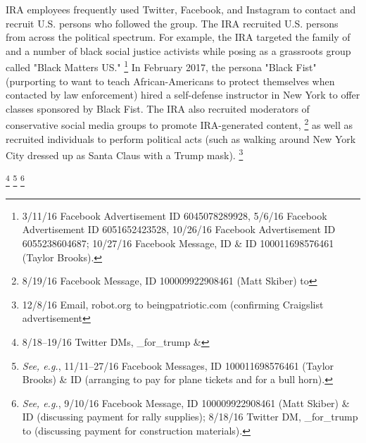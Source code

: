 IRA employees frequently used  Twitter, Facebook, and Instagram to contact and recruit U.S. persons who followed the group.
The IRA recruited U.S. persons from across the political spectrum.
For example, the IRA targeted the family of  and a number of black social justice activists while posing as a grassroots group called "Black Matters US\null."%
\footnote{3/11/16 Facebook Advertisement ID 6045078289928, 5/6/16 Facebook Advertisement ID 6051652423528, 10/26/16 Facebook Advertisement ID 6055238604687;
10/27/16 Facebook Message, ID  \& ID 100011698576461 (Taylor Brooks).}
In February 2017, the persona "Black Fist" (purporting to want to teach African-Americans to protect themselves when contacted by law enforcement) hired a self-defense instructor in New York to offer classes sponsored by Black Fist.
The IRA also recruited moderators of conservative social media groups to promote IRA-generated content,%
\footnote{8/19/16 Facebook Message, ID 100009922908461 (Matt Skiber) to }
as well as recruited individuals to perform political acts (such as walking around New York City dressed up as Santa Claus with a Trump mask).%
\footnote{12/8/16 Email, robot\@craigslist.org to beingpatriotic\@gmail.com (confirming Craigslist advertisement}

\footnote{8/18--19/16 Twitter DMs, \@march\_for\_trump \& }
\footnote{\textit{See, e.g.}, 11/11--27/16 Facebook Messages, ID 100011698576461 (Taylor Brooks) \& ID  (arranging to pay for plane tickets and for a bull horn).
}
\footnote{\textit{See, e.g.}, 9/10/16 Facebook Message, ID 100009922908461 (Matt Skiber) \& ID  (discussing payment for rally supplies);
8/18/16 Twitter DM, \@march\_for\_trump to  (discussing payment for construction materials).}

